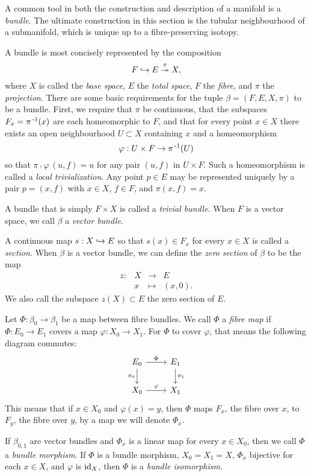 A common tool in both the construction and description of a manifold is a \emph{bundle}.
The ultimate construction in this section is the tubular neighbourhood of a submanifold, which is unique up to a fibre-preserving isotopy.

\begin{defn}[Bundles]
	A bundle is most concisely represented by the composition
	\[
		F\hookrightarrow E\overset{\pi}{\twoheadrightarrow} X,
	\]
	where $X$ is called the \emph{base space}, $E$ the \emph{total space}, $F$ the \emph{fibre}, and $\pi$ the \emph{projection}.
	There are some basic requirements for the tuple $\beta = (F,E,X,\pi)$ to be a bundle.
	First, we require that $\pi$ be continuous, that the subspaces $F_x = \pi^{\,\text{-}1}(x)$ are each homeomorphic to $F$, and that for every point $x\in X$ there exists an open neighbourhood $U\subset X$ containing $x$ and a homeomorphism
	\[
		\varphi: U\times F\to \pi^{\,\text{-}1}(U)
	\]
	so that $\pi\comp\varphi\,(u,f)=u$ for any pair $(u,f)$ in $U\times F$.
	Such a homeomorphism is called a \emph{local trivialization}.
	Any point $p\in E$ may be represented uniquely by a pair $p=(x,f)$ with $x\in X$, $f\in F$, and $\pi(x,f)=x$.
	
	A bundle that is simply $F\times X$ is called a \emph{trivial bundle}.
	When $F$ is a vector space, we call $\beta$ a \emph{vector bundle}.
	
	A continuous map $s:X\hookrightarrow E$ so that $s(x)\in F_x$ for every $x\in X$ is called a \emph{section}.
	When $\beta$ is a vector bundle, we can define the \emph{zero section} of $\beta$ to be the map
	\[
		\begin{array}{cccc}
			z: & X & \to 	 & E \\
			   & x & \mapsto & (x,0).
		\end{array}
	\]
	We also call the subspace $z(X)\subset E$ the zero section of $E$.
\end{defn}

\begin{defn}
	Let $\Phi:\beta_0\to \beta_1$ be a map between fibre bundles.
	We call $\Phi$ a \emph{fibre map} if $\Phi:E_0\to E_1$ covers a map $\varphi:X_0\to X_1$.
	For $\Phi$ to cover $\varphi$, that means the following diagram commutes:
	\[
		\begin{tikzcd}
			E_0 \arrow{r}{\Phi} \arrow[swap]{d}{\pi_0} & E_1 \arrow{d}{\pi_1} \\
			X_0 \arrow{r}{\varphi} & X_1
		\end{tikzcd}
	\]
	This means that if $x\in X_0$ and $\varphi(x)=y$, then $\Phi$ maps $F_x$, the fibre over $x$, to $F_y$, the fibre over $y$, by a map we will denote $\Phi_x$.

	If $\beta_{0,1}$ are vector bundles and $\Phi_x$ is a linear map for every $x\in X_0$, then we call $\Phi$ a \emph{bundle morphism}.
	If $\Phi$ is a bundle morphism, $X_0=X_1=X$, $\Phi_x$ bijective for each $x\in X$, and $\varphi$ is $\textrm{id}_{X}$, then $\Phi$ is a \emph{bundle isomorphism}.
\end{defn}

